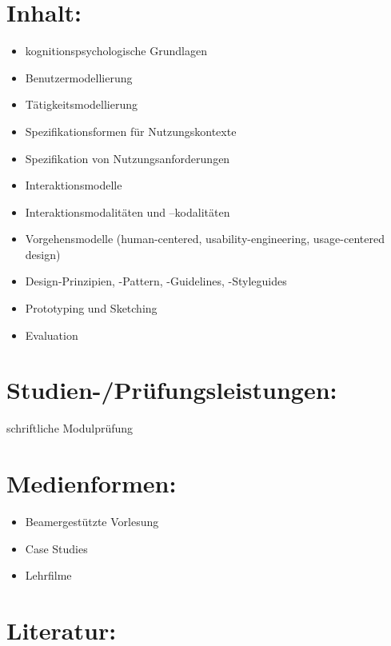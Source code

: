 \section*{Inhalt:}\label{inhalt-15}

\begin{itemize}
\item
  kognitionspsychologische Grundlagen
\item
  Benutzermodellierung
\item
  Tätigkeitsmodellierung
\item
  Spezifikationsformen für Nutzungskontexte
\item
  Spezifikation von Nutzungsanforderungen
\item
  Interaktionsmodelle
\item
  Interaktionsmodalitäten und --kodalitäten
\item
  Vorgehensmodelle (human-centered, usability-engineering,
  usage-centered design)
\item
  Design-Prinzipien, -Pattern, -Guidelines, -Styleguides
\item
  Prototyping und Sketching
\item
  Evaluation
\end{itemize}

\section*{Studien-/Prüfungsleistungen:}\label{studien-pruxfcfungsleistungen-13}

schriftliche Modulprüfung

\section*{Medienformen:}\label{medienformen-8}

\begin{itemize}
\item
  Beamergestützte Vorlesung
\item
  Case Studies
\item
  Lehrfilme
\end{itemize}

\section*{Literatur:}\label{literatur-12}

